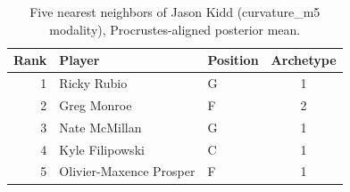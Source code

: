 \begin{table}[htbp]
  \centering\small
  \begin{tabular}{rllc}
    \toprule
    Rank & Player & Position & Archetype \\
    \midrule
    1 & Ricky Rubio & G & 1 \\
    2 & Greg Monroe & F & 2 \\
    3 & Nate McMillan & G & 1 \\
    4 & Kyle Filipowski & C & 1 \\
    5 & Olivier-Maxence Prosper & F & 1 \\
    \bottomrule
  \end{tabular}
  \caption{Five nearest neighbors of Jason Kidd (curvature_m5 modality), Procrustes-aligned posterior mean.}
  \label{tab:Jason_Kidd_neighbors_curvature_m5}
\end{table}

